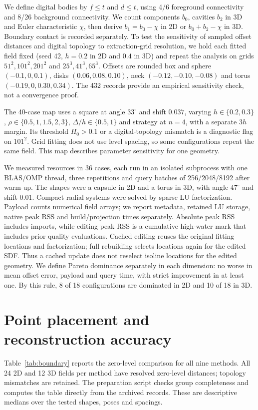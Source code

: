 \documentclass[12pt,letterpaper]{article}
\begin{document}
We define digital bodies by $f\le t$ and $d\le t$, using 4/6 foreground connectivity and 8/26 background connectivity. We count components $b_0$, cavities $b_2$ in 3D and Euler characteristic $\chi$, then derive $b_1=b_0-\chi$ in 2D or $b_0+b_2-\chi$ in 3D. Boundary contact is recorded separately. To test the sensitivity of sampled offset distances and digital topology to extraction-grid resolution, we hold each fitted field fixed (seed 42, $h=0.2$ in 2D and $0.4$ in 3D) and repeat the analysis on grids $51^2,101^2,201^2$ and $25^3,41^3,65^3$. Offsets are rounded box and sphere $(-0.1,0,0.1)$, disks $(0.06,0.08,0.10)$, neck $(-0.12,-0.10,-0.08)$ and torus $(-0.19,0,0.30,0.34)$. The 432 records provide an empirical sensitivity check, not a convergence proof.

The 40-case map uses a square at angle $33^\circ$ and shift $0.037$, varying $h\in\{0.2,0.3\}$, $\rho\in\{0.5,1,1.5,2,3\}$, $\Delta/h\in\{0.5,1\}$ and strategy at $n=4$, with a separate $3h$ margin. Its threshold $H_0>0.1$ or a digital-topology mismatch is a diagnostic flag on $101^2$. Grid fitting does not use level spacing, so some configurations repeat the same field. This map describes parameter sensitivity for one geometry.

We measured resources in 36 cases, each run in an isolated subprocess with one BLAS/OMP thread, three repetitions and query batches of 256/2048/8192 after warm-up. The shapes were a capsule in 2D and a torus in 3D, with angle $47^\circ$ and shift $0.01$. Compact radial systems were solved by sparse LU factorization. Payload counts numerical field arrays; we report metadata, retained LU storage, native peak RSS and build/projection times separately. Absolute peak RSS includes imports, while editing peak RSS is a cumulative high-water mark that includes prior quality evaluations. Cached editing reuses the original fitting locations and factorization; full rebuilding selects locations again for the edited SDF. Thus a cached update does not reselect isoline locations for the edited geometry. We define Pareto dominance separately in each dimension: no worse in mean offset error, payload and query time, with strict improvement in at least one. By this rule, 8 of 18 configurations are dominated in 2D and 10 of 18 in 3D.

\section{Point placement and reconstruction accuracy}
Table~\ref{tab:boundary} reports the zero-level comparison for all nine methods. All 24 2D and 12 3D fields per method have resolved zero-level distances; topology mismatches are retained. The preparation script checks group completeness and computes the table directly from the archived records. These are descriptive medians over the tested shapes, poses and spacings.
\begin{table}[htbp]\centering\small\caption{Held-out zero-level results: median near-boundary field RMSE $E_0$, median sampled boundary distance $H_0$, and digital-topology matches out of all fields. The topology counts use the stated extraction grids and connectivity.}\label{tab:boundary}\end{table}
\end{document}
